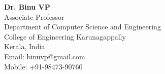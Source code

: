 \documentclass[mm]{simple_style}
\begin{document}
\begin{resume}
\textbf {Dr. Binu VP}\\ 
Associate Professor\\ 
Department of Computer Science and Engineering \\ 
College of Engineering Karunagappally \\ Kerala, India \\
Email: binuvp@gmail.com \\
Mobile: +91-98473-90760 \\
\sectionline

\end{resume}
\end{document}
